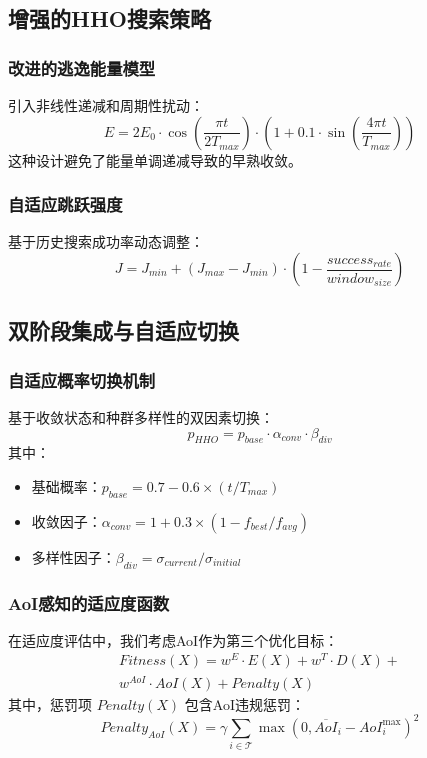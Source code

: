 \documentclass[conference]{IEEEtran}
\begin{document}
\subsection{增强的HHO搜索策略}
\subsubsection{改进的逃逸能量模型}
引入非线性递减和周期性扰动\cite{b15}：
\begin{equation}
E = 2E_0 \cdot \cos\left(\frac{\pi t}{2T_{max}}\right) \cdot \left(1 + 0.1 \cdot \sin\left(\frac{4\pi t}{T_{max}}\right)\right)
\end{equation}
这种设计避免了能量单调递减导致的早熟收敛。
\subsubsection{自适应跳跃强度}
基于历史搜索成功率动态调整\cite{b16}：
\begin{equation}
J = J_{min} + (J_{max} - J_{min}) \cdot \left(1 - \frac{success_{rate}}{window_{size}}\right)
\end{equation}
\subsection{双阶段集成与自适应切换}
\subsubsection{自适应概率切换机制}
基于收敛状态和种群多样性的双因素切换：
\begin{equation}
p_{HHO} = p_{base} \cdot \alpha_{conv} \cdot \beta_{div}
\end{equation}
其中：
\begin{itemize}
    \item 基础概率：$p_{base} = 0.7 - 0.6 \times (t/T_{max})$
    \item 收敛因子：$\alpha_{conv} = 1 + 0.3 \times (1 - f_{best}/f_{avg})$
    \item 多样性因子：$\beta_{div} = \sigma_{current}/\sigma_{initial}$
\end{itemize}

\subsubsection{AoI感知的适应度函数}
在适应度评估中，我们考虑AoI作为第三个优化目标：
\begin{equation}
    \begin{split}
        Fitness(X) = w^E \cdot E(X) + w^T \cdot D(X) + \\ 
        w^{AoI} \cdot AoI(X) + Penalty(X)
    \end{split}
\end{equation}
其中，惩罚项 $Penalty(X)$ 包含AoI违规惩罚：
\begin{equation}
Penalty_{AoI}(X) = \gamma \sum_{i \in \mathcal{T}} \max(0, \overline{AoI}_i - AoI_i^{\max})^2
\end{equation}
\end{document}
